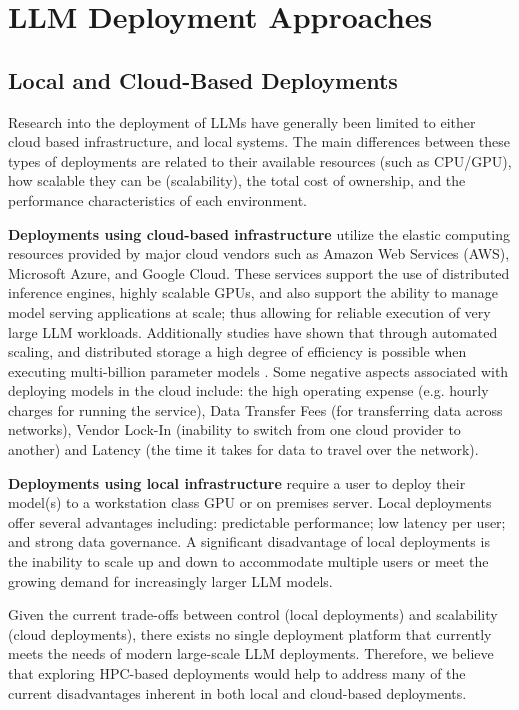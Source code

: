 \section{LLM Deployment Approaches}

\subsection{Local and Cloud-Based Deployments}

Research into the deployment of \ac{LLM}s have generally been limited to either cloud based infrastructure, and local systems. The main differences between these types of deployments are related to their available resources (such as CPU/GPU), how scalable they can be (scalability), the total cost of ownership, and the performance characteristics of each environment.

\textbf{Deployments using cloud-based infrastructure} utilize the elastic computing resources provided by major cloud vendors such as Amazon Web Services (\ac{AWS}), Microsoft Azure, and Google Cloud. These services support the use of distributed inference engines, highly scalable \acp{GPU}, and also support the ability to manage model serving applications at scale; thus allowing for reliable execution of very large \ac{LLM} workloads. Additionally studies have shown that through automated scaling, and distributed storage a high degree of efficiency is possible when executing multi-billion parameter models \cite{narayanan2021cloudscale}. Some negative aspects associated with deploying models in the cloud include: the high operating expense (e.g. hourly charges for running the service), Data Transfer Fees (for transferring data across networks), Vendor Lock-In (inability to switch from one cloud provider to another) and Latency (the time it takes for data to travel over the network).

\textbf{Deployments using local infrastructure} require a user to deploy their model(s) to a workstation class \ac{GPU} or on premises server. Local deployments offer several advantages including: predictable performance; low latency per user; and strong data governance. A significant disadvantage of local deployments is the inability to scale up and down to accommodate multiple users or meet the growing demand for increasingly larger \ac{LLM} models.

Given the current trade-offs between control (local deployments) and scalability (cloud deployments), there exists no single deployment platform that currently meets the needs of modern large-scale \ac{LLM} deployments. Therefore, we believe that exploring HPC-based deployments would help to address many of the current disadvantages inherent in both local and cloud-based deployments.

